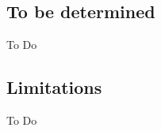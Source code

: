 

\subsection{To be determined}\label{subsec:4a}
To Do


\subsection{Limitations}\label{subsec:4e}
To Do